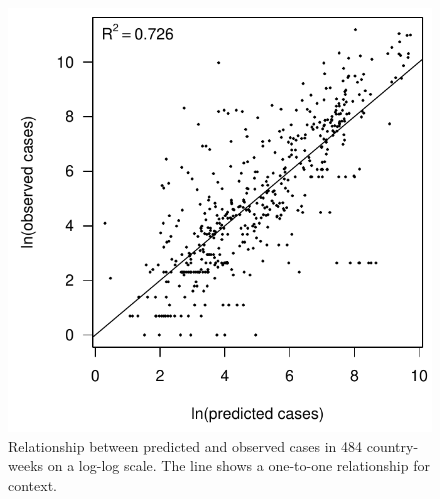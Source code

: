 \documentclass[11pt]{article}
\begin{document}
\newpage
\begin{figure}[!ht]
\begin{center}
\includegraphics{../output/fitted_lm_best.pdf}
\end{center}
\caption{
Relationship between predicted and observed cases in 484 country-weeks on a log-log scale. The line shows a one-to-one relationship for context.
}
\end{figure}
\end{document}
